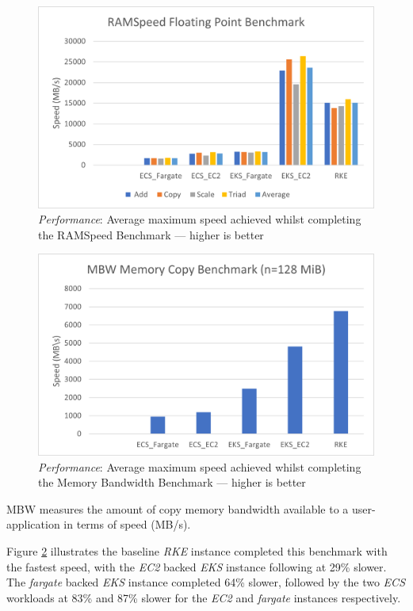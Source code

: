 \begin{figure}[htbp]
  \includegraphics[width=\textwidth]{images/perf-RAMSpeed.png}
  \caption{\emph{Performance}: Average maximum speed achieved whilst completing the RAMSpeed Benchmark --- higher is better}
  \label{fig:perf_RAMSpeed}
\end{figure}

\begin{figure}[htbp]
  \includegraphics[width=\textwidth]{images/perf-MBW.png}
  \caption{\emph{Performance}: Average maximum speed achieved whilst completing the Memory Bandwidth Benchmark --- higher is better}
  \label{fig:perf_MBW}
\end{figure}

\noindent \newline MBW measures the amount of copy memory bandwidth available to a user-application in terms of speed (MB/s).

Figure \ref{fig:perf_MBW} illustrates the baseline \textit{RKE} instance completed this benchmark with the fastest speed, with the \textit{EC2} backed \textit{EKS} instance following at 29\% slower.
The \textit{fargate} backed \textit{EKS} instance completed 64\% slower,
followed by the two \textit{ECS} workloads at 83\% and 87\% slower for the \textit{EC2} and \textit{fargate} instances respectively.

